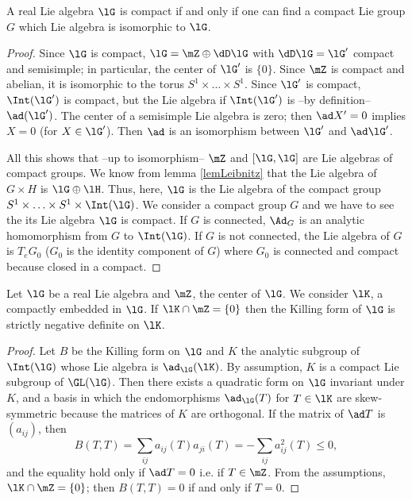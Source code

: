 \begin{proposition}
A real Lie algebra $\lG$ is compact if and only if one can find a compact Lie group $G$ which Lie algebra is isomorphic to $\lG$.
\label{prop:alg_grp_compact}
\end{proposition}

\begin{proof}
 Since $\lG$ is compact, $\lG=\mZ\oplus\dD\lG$ with $\dD\lG=\lG'$ compact and semisimple; in particular, the center of $\lG'$ is $\{0\}$. Since $\mZ$ is compact and abelian, it is isomorphic to the torus $S^1\times\ldots\times S^1$. Since $\lG'$ is compact, $\Int(\lG')$ is compact, but the Lie algebra if $\Int(\lG')$ is --by definition--  $\ad(\lG')$. The center of a semisimple Lie algebra is zero; then $\ad X'=0$ implies $X=0$ (for $X\in\lG'$). Then $\ad$ is an isomorphism between $\lG'$ and $\ad\lG'$.

All this shows that --up to isomorphism-- $\mZ$ and $[\lG,\lG]$ are Lie algebras of compact groups. We know from lemma \ref{lemLeibnitz} that the Lie algebra of $G\times H$ is $\lG\oplus\lH$. Thus, here, $\lG$ is the Lie algebra of the compact group $S^1\times\ldots\times S^1\times\Int(\lG)$.
We consider a compact group $G$ and we have to see the its Lie algebra $\lG$ is compact. If $G$ is connected, $\Ad_G$ is an analytic homomorphism from $G$ to $\Int(\lG)$. If $G$ is not connected, the Lie algebra of $G$ is $T_eG_0$ ($G_0$ is the identity component of $G$) where $G_0$ is connected and compact because closed in a compact.
\end{proof}
 
\begin{proposition}
Let $\lG$ be a real Lie algebra and $\mZ$, the center of $\lG$. We consider $\lK$, a compactly embedded in $\lG$. If $\lK\cap\mZ=\{0\}$ then the Killing form of $\lG$ is strictly negative definite on $\lK$.
\label{prop:K_Z_Killing}
\end{proposition}

\begin{proof}
Let $B$ be the Killing form on $\lG$ and $K$ the analytic subgroup of $\Int(\lG)$ whose Lie algebra is $\ad_{\lG}(\lK)$. By assumption, $K$ is a compact Lie subgroup of $\GL(\lG)$. Then there exists a quadratic form on $\lG$ invariant under $K$, and a basis in which the endomorphisms $\ad_{\lG}(T)$ for $T\in\lK$ are skew-symmetric because the matrices of $K$ are orthogonal. If the matrix of $\ad T$ is $(a_{ij})$, then
\begin{equation}
   B(T,T)=\sum_{ij}a_{ij}(T)a_{ji}(T)
         =-\sum_{ij}a_{ij}^2(T)\leq 0,
\end{equation}
and the equality hold only if $\ad T=0$ i.e. if $T\in\mZ$. From the assumptions, $\lK\cap\mZ=\{0\}$; then $B(T,T)=0$ if and only if $T=0$. 
\end{proof}

